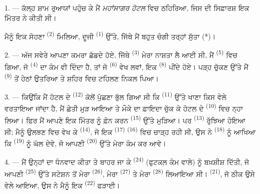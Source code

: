 %


\VUsaut{3.0mm}
\VUsaut{1.6mm}
\VUsaut{2.0mm}
\VUsaut{3.4mm}

1. --- ਕੱਲ੍ਹ ਸ਼ਾਮ ਰੁਆਯਾਂ ਪਹੁੰਚ ਕੇ ਮੈਂ \textit{ਮਹਾਂਸਾਗਰ ਹੋਟਲ} ਵਿਚ ਠਹਿਰਿਆ, ਜਿਸ ਦੀ
ਸਿਫ਼ਾਰਸ਼ ਇਕ ਮਿੱਤਰ ਨੇ ਕੀਤੀ ਸੀ।

ਮੈਨੂੰ ਇਕ ਸੋਹਣਾ  \textsuperscript{(2)} ਮਿਲਿਆ, ਦੂਜੀ 
\textsuperscript{(1)} ਉੱਤੇ, ਜਿੱਥੇ ਮੈਂ ਬਹੁਤ ਚੰਗੀ ਤਰ੍ਹਾਂ ਸੁੱਤਾ (*)।

2. --- ਅੱਜ ਸਵੇਰੇ ਆਪਣਾ ਕਮਰਾ ਛੱਡਦੇ ਹੋਏ, ਜਿੱਥੇ 
\textsuperscript{(3)} ਮੇਰਾ ਨਾਸ਼ਤਾ ਲੈ ਆਈ ਸੀ, ਮੈਂ 
\textsuperscript{(5)} ਵਿਚ ਗਿਆ, ਜੋ  \textsuperscript{(4)} ਦਾ ਕੰਮ
ਵੀ ਦਿੰਦਾ ਹੈ, ਤਾਂ ਜੋ  \textsuperscript{(6)} ਵੇਖ ਲਵਾਂ, ਇਕ
 \textsuperscript{(8)} ਪੀਂਦੇ ਹੋਏ। ਪੜ੍ਹ ਚੁੱਕਣ ਉੱਤੇ ਮੈਂ 
\textsuperscript{(9)} ਤੋਂ ਹੇਠਾਂ ਉਤਰਿਆ ਤੇ ਸ਼ਹਿਰ ਵਿਚ ਟਹਿਲਣ ਨਿਕਲ ਪਿਆ।

3. --- ਕਿਉਂਕਿ ਮੈਂ ਹੋਟਲ ਦੇ  \textsuperscript{(12)} ਕੋਲੋਂ ਪੁੱਛਣਾ ਭੁੱਲ
ਗਿਆ ਸੀ ਕਿ  \textsuperscript{(11)} ਉੱਤੇ ਖਾਣਾ ਕਿਸ ਵੇਲੇ ਵਰਤਾਇਆ
ਜਾਂਦਾ ਹੈ, ਮੈਂ ਛੇਤੀ ਮੁੜ ਆਇਆ ਤੇ ਮੌਕੇ ਦਾ ਫ਼ਾਇਦਾ ਚੁੱਕ ਕੇ ਹੋਟਲ ਦੇ
 \textsuperscript{(10)} ਵਿਚ ਨ੍ਹਾ ਲਿਆ। ਫਿਰ ਮੈਂ ਆਪਣੇ ਇਕ ਮਿੱਤਰ
ਨੂੰ ਫ਼ੋਨ ਕਰਨ  \textsuperscript{(15)} ਉੱਤੇ ਮੁੜਿਆ। ਪਰ 
\textsuperscript{(13)} ਰੁੱਝਿਆ ਹੋਇਆ ਸੀ; ਮੈਨੂੰ ਉਲਝਣ ਵਿਚ ਵੇਖ ਕੇ 
\textsuperscript{(14)}, ਜੋ ਇਕ  \textsuperscript{(17)}
 \textsuperscript{(16)} ਵਿਚ ਚਾੜ੍ਹ ਰਹੀ ਸੀ, ਉਸ ਨੇ
 \textsuperscript{(18)} ਨੂੰ ਆਖਿਆ ਕਿ 
\textsuperscript{(19)} ਨੂੰ ਘੱਲ ਦੇਵੇ, ਜੋ ਆਪਣੀ  \textsuperscript{(20)}
ਉੱਤੇ ਮੇਰਾ ਕੰਮ ਕਰ ਆਵੇ।

4. --- ਮੈਂ ਉਨ੍ਹਾਂ ਦਾ ਧੰਨਵਾਦ ਕੀਤਾ ਤੇ ਬਾਹਰ ਜਾ ਕੇ 
\textsuperscript{(24)} (ਫੁਟਕਲ ਕੰਮ ਵਾਲੇ) ਨੂੰ ਬਖ਼ਸ਼ੀਸ਼ ਦਿੱਤੀ, ਜੋ ਆਪਣੀ
 \textsuperscript{(25)} ਉੱਤੇ ਸਟੇਸ਼ਨ ਤੋਂ ਮੇਰਾ
 \textsuperscript{(26)}, ਮੇਰਾ 
\textsuperscript{(27)} ਤੇ ਮੇਰਾ  \textsuperscript{(28)} ਲਿਆਇਆ ਸੀ।
 \textsuperscript{(21)}, ਜੋ ਠੀਕ ਉਸੇ ਵੇਲੇ ਆਇਆ, ਉਸ ਨੇ ਮੈਨੂੰ ਇਕ
 \textsuperscript{(22)} ਫੜਾਈ।

